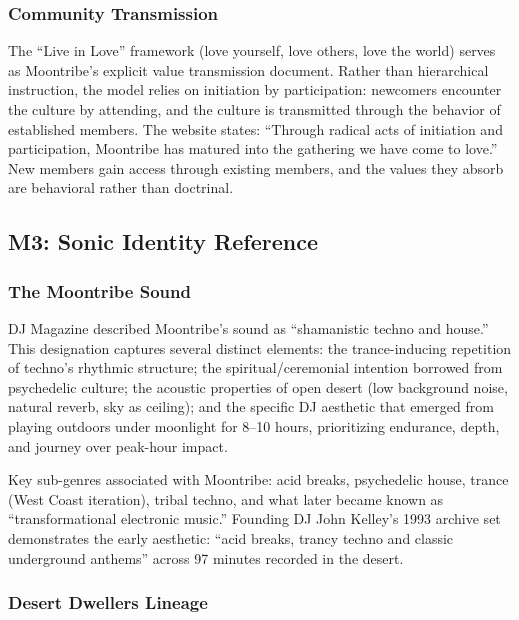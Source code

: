 \documentclass[11pt,letterpaper]{article}
\begin{document}
\subsubsection{Community Transmission}

The ``Live in Love'' framework (love yourself, love others, love the world) serves as Moontribe's explicit value transmission document. Rather than hierarchical instruction, the model relies on initiation by participation: newcomers encounter the culture by attending, and the culture is transmitted through the behavior of established members. The website states: ``Through radical acts of initiation and participation, Moontribe has matured into the gathering we have come to love.'' New members gain access through existing members, and the values they absorb are behavioral rather than doctrinal.

\subsection{M3: Sonic Identity Reference}

\subsubsection{The Moontribe Sound}

DJ Magazine described Moontribe's sound as ``shamanistic techno and house.'' This designation captures several distinct elements: the trance-inducing repetition of techno's rhythmic structure; the spiritual/ceremonial intention borrowed from psychedelic culture; the acoustic properties of open desert (low background noise, natural reverb, sky as ceiling); and the specific DJ aesthetic that emerged from playing outdoors under moonlight for 8--10 hours, prioritizing endurance, depth, and journey over peak-hour impact.

Key sub-genres associated with Moontribe: acid breaks, psychedelic house, trance (West Coast iteration), tribal techno, and what later became known as ``transformational electronic music.'' Founding DJ John Kelley's 1993 archive set demonstrates the early aesthetic: ``acid breaks, trancy techno and classic underground anthems'' across 97 minutes recorded in the desert.

\subsubsection{Desert Dwellers Lineage}
\end{document}
